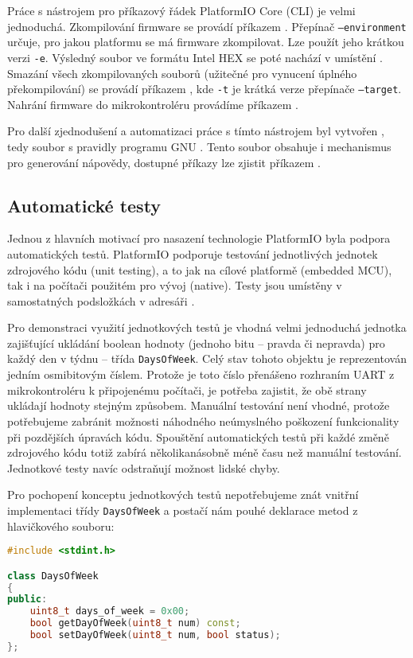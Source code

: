 Práce s nástrojem pro příkazový řádek PlatformIO Core (CLI) je velmi
jednoduchá. Zkompilování firmware se provádí příkazem
. Přepínač \texttt{--environment} určuje,
pro jakou platformu se má firmware zkompilovat. Lze použít jeho krátkou verzi
\texttt{-e}. Výsledný soubor ve formátu Intel HEX se poté nachází v umístění
. Smazání všech zkompilovaných souborů
(užitečné pro vynucení úplného překompilování) se provádí příkazem
, kde \texttt{-t} je krátká verze přepínače
\texttt{--target}. Nahrání firmware do mikrokontroléru provádíme příkazem
.

Pro další zjednodušení a automatizaci práce s tímto nástrojem byl vytvořen
, tedy soubor s pravidly programu GNU .
Tento soubor obsahuje i mechanismus pro generování nápovědy, dostupné příkazy
lze zjistit příkazem .

\subsection{Automatické testy}
Jednou z hlavních motivací pro nasazení technologie PlatformIO byla podpora
automatických testů. PlatformIO podporuje testování jednotlivých jednotek
zdrojového kódu (unit testing), a to jak na cílové platformě (embedded MCU),
tak i na počítači použitém pro vývoj (native). Testy jsou umístěny
v samostatných podsložkách v adresáři .

Pro demonstraci využití jednotkových testů je vhodná velmi jednoduchá jednotka
zajišťující ukládání boolean hodnoty (jednoho bitu -- pravda či nepravda) pro
každý den v týdnu -- třída \texttt{DaysOfWeek}. Celý stav tohoto objektu je
reprezentován jedním osmibitovým číslem. Protože je toto číslo přenášeno
rozhraním UART z mikrokontroléru k připojenému počítači, je potřeba zajistit,
že obě strany ukládají hodnoty stejným způsobem. Manuální testování není
vhodné, protože potřebujeme zabránit možnosti náhodného neúmyslného poškození
funkcionality při pozdějších úpravách kódu. Spouštění automatických testů při
každé změně zdrojového kódu totiž zabírá několikanásobně méně času než manuální
testování. Jednotkové testy navíc odstraňují možnost lidské chyby.

Pro pochopení konceptu jednotkových testů nepotřebujeme znát vnitřní
implementaci třídy \texttt{DaysOfWeek} a postačí nám pouhé deklarace
metod z hlavičkového souboru:
\begin{lstlisting}[language=C++]
#include <stdint.h>

class DaysOfWeek
{
public:
    uint8_t days_of_week = 0x00;
    bool getDayOfWeek(uint8_t num) const;
    bool setDayOfWeek(uint8_t num, bool status);
};
\end{lstlisting}

